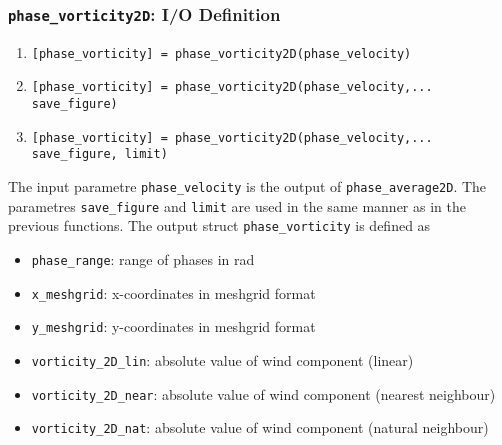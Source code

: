 \documentclass[
12pt,
a4paper,
twoside]
{article}
\begin{document}
\subsubsection{\texttt{phase\_{}vorticity2D}: I/O Definition}
\begin{enumerate}
\item \verb![phase_vorticity] = phase_vorticity2D(phase_velocity)!
\item \verb![phase_vorticity] = phase_vorticity2D(phase_velocity,...!\\ \verb!save_figure)!
\item \verb![phase_vorticity] = phase_vorticity2D(phase_velocity,...!\\ \verb!save_figure, limit)!
\end{enumerate}
The input parametre \verb!phase_velocity! is the output of \texttt{phase\_{}average2D}. The parametres \verb!save_figure! and \verb!limit! are used in the same manner as in the previous functions.
The output struct \verb!phase_vorticity! is defined as
\begin{itemize}
\item \verb!phase_range!: range of phases in rad
\item \verb!x_meshgrid!: x-coordinates in meshgrid format
\item \verb!y_meshgrid!: y-coordinates in meshgrid format
\item \verb!vorticity_2D_lin!: absolute value of wind component (linear)
\item \verb!vorticity_2D_near!: absolute value of wind component (nearest neighbour)
\item \verb!vorticity_2D_nat!: absolute value of wind component (natural neighbour)
\end{itemize}
\end{document}
